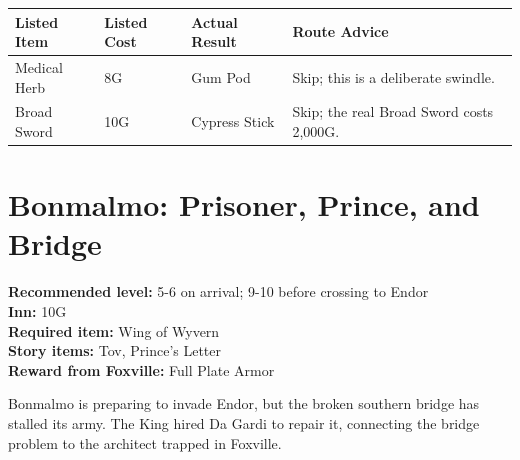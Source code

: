\documentclass[
  american,
  10pt,
  letterpaper,
  oneside,
  open=any]{scrreprt}
\newcounter{none} %
\newenvironment{guidetable}{%
  \small\setstretch{1.0}%
  \setlength{\tabcolsep}{4pt}%
  \setlength{\LTpre}{8pt}\setlength{\LTpost}{10pt}%
  \renewcommand{\arraystretch}{1.16}%
}{ }
\begin{document}
\begin{guidetable}

{\def\LTcaptype{none} %
\begin{longtable}[]{@{}
  >{\raggedright\arraybackslash}p{}
  >{\raggedleft\arraybackslash}p{}
  >{\raggedright\arraybackslash}p{}
  >{\raggedright\arraybackslash}p{}@{}}
\toprule\noalign{}
\begin{minipage}[b]{\linewidth}\raggedright
\color{GuideGreen}\bfseries Listed Item
\end{minipage} & \begin{minipage}[b]{\linewidth}\raggedleft
\color{GuideGreen}\bfseries Listed Cost
\end{minipage} & \begin{minipage}[b]{\linewidth}\raggedright
\color{GuideGreen}\bfseries Actual Result
\end{minipage} & \begin{minipage}[b]{\linewidth}\raggedright
\color{GuideGreen}\bfseries Route Advice
\end{minipage} \\
\midrule\noalign{}
\endhead
\bottomrule\noalign{}
\endlastfoot
Medical Herb & 8G & Gum Pod & Skip; this is a deliberate swindle. \\
Broad Sword & 10G & Cypress Stick & Skip; the real Broad Sword costs
2,000G. \\
\end{longtable}
}

\end{guidetable}

\section{Bonmalmo: Prisoner, Prince, and
Bridge}\label{bonmalmo-prisoner-prince-and-bridge}

\textbf{Recommended level:} 5-6 on arrival; 9-10 before crossing to
Endor\\
\textbf{Inn:} 10G\\
\textbf{Required item:} Wing of Wyvern\\
\textbf{Story items:} Tov, Prince's Letter\\
\textbf{Reward from Foxville:} Full Plate Armor

Bonmalmo is preparing to invade Endor, but the broken southern bridge
has stalled its army. The King hired Da Gardi to repair it, connecting
the bridge problem to the architect trapped in Foxville.
\end{document}
